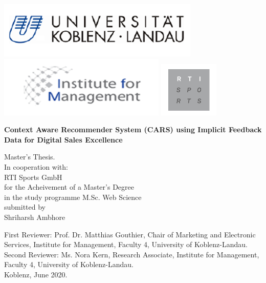 
\begin{flushleft}
    \hspace{0.5cm}
    \includegraphics[scale=0.9]{images/uni.png}
    \hspace{0.6cm}
    \includegraphics[scale=0.9]{images/im.png}
    \hspace{0.7cm}
    \includegraphics[scale=0.9]{images/rti.png}
\end{flushleft}
\vspace{0.5cm}
\begin{center}
\large{\textbf{ Context Aware Recommender System (CARS) using Implicit Feedback Data for Digital Sales Excellence}}\\
\vspace{1cm} 

Master's Thesis.\\
\vspace{0.5cm}
In cooperation with:\\
RTI Sports GmbH\\
\vspace*{1cm}
for the Acheivement of a Master's Degree\\
in the study programme M.Sc. Web Science\\
\vspace{1cm}
submitted by\\
\vspace{0.5cm} Shriharsh Ambhore
\vspace{1cm}

\end{center}

\begin{flushleft}
\renewcommand{\baselinestretch}{1.5}

First Reviewer: Prof. Dr. Matthias Gouthier, Chair of Marketing and Electronic Services, Institute for Management, Faculty 4, University of Koblenz-Landau. \\
\vspace{0.5cm}
Second Reviewer: Ms. Nora Kern, Research Associate, Institute for Management, Faculty 4, University of Koblenz-Landau. \\
\vspace{0.3cm}
Koblenz, June 2020.
\end{flushleft}

